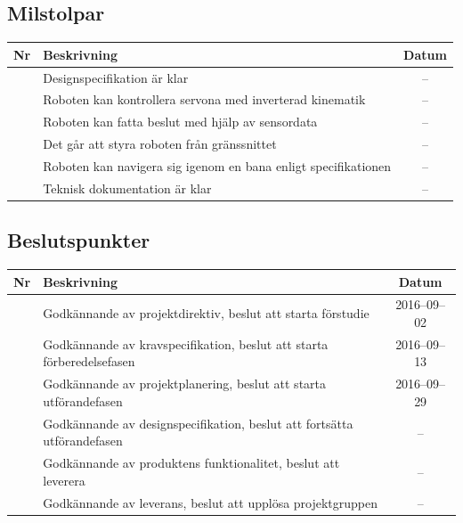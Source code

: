 \documentclass[a4paper,titlepage,12pt]{article}
\newcounter{milNr}
\newcommand{\nextMilNr}{\stepcounter{milNr}\arabic{milNr}}
\newcounter{bpNr}
\newcommand{\nextBPNr}{\stepcounter{bpNr}\arabic{bpNr}}
\begin{document}
	\subsection{Milstolpar}
	\begin{longtable}[c]{ c l c}
		\textbf{Nr} & \textbf{Beskrivning} & \textbf{Datum} \\ \midrule
		\nextMilNr{} & Designspecifikation är klar & -- \\ \midrule
		\nextMilNr{} & Roboten kan kontrollera servona med inverterad kinematik & -- \\ \midrule
		\nextMilNr{} & Roboten kan fatta beslut med hjälp av sensordata & -- \\ \midrule
		\nextMilNr{} & Det går att styra roboten från gränssnittet & -- \\ \midrule
		\nextMilNr{} & Roboten kan navigera sig igenom en bana enligt specifikationen& -- \\ \midrule
		\nextMilNr{} & Teknisk dokumentation är klar & -- \\ \midrule
	\end{longtable}
	
	
	\subsection{Beslutspunkter}
	\renewcommand*{\arraystretch}{1.4}
    \begin{longtable}[c]{ c p{} c}
		\textbf{Nr} & \textbf{Beskrivning} & \textbf{Datum} \\ \midrule
		\nextBPNr{} & Godkännande av projektdirektiv, beslut att starta förstudie & 2016--09--02 \\ \midrule
		\nextBPNr{} & Godkännande av kravspecifikation, beslut att starta förberedelsefasen & 2016--09--13 \\ \midrule
		\nextBPNr{} & Godkännande av projektplanering, beslut att starta utförandefasen & 2016--09--29 \\ \midrule
		\nextBPNr{} & Godkännande av designspecifikation, beslut att fortsätta
		utförandefasen & -- \\ \midrule
		\nextBPNr{} & Godkännande av produktens funktionalitet, beslut att leverera & -- \\ \midrule
		\nextBPNr{} & Godkännande av leverans, beslut att upplösa projektgruppen & -- \\ \midrule
	\end{longtable}
	
	
\end{document}
